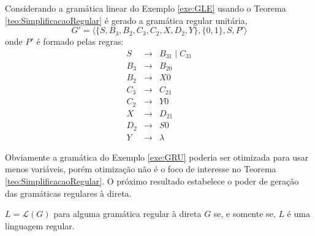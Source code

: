 \begin{exemplo}\label{exe:GRU}
	Considerando a gramática linear do Exemplo \ref{exe:GLE} usando o Teorema \ref{teo:SimplificacaoRegular} é gerado a gramática regular unitária, 
	$$G' = \langle \{S, B_3, B_2, C_3, C_2, X, D_2, Y\}, \{0, 1\}, S, P'\rangle$$ 
	onde $P'$ é formado pelas regras:
	\begin{eqnarray*}
		S & \rightarrow & B_31 \mid C_31\\
		B_3 & \rightarrow & B_20\\
		B_2 & \rightarrow & X0\\
		C_3 & \rightarrow & C_21\\
		C_2 & \rightarrow & Y0\\
		X & \rightarrow & D_21\\
		D_2 & \rightarrow& S0\\
		Y & \rightarrow & \lambda
	\end{eqnarray*}
\end{exemplo}

Obviamente a gramática do Exemplo \ref{exe:GRU} poderia ser otimizada para usar menos variáveis, porém otimização não é o foco de interesse no Teorema \ref{teo:SimplificacaoRegular}. O próximo resultado estabelece o poder de geração das gramáticas regulares à direta.

\begin{teorema}\label{teo:GRD-AFD}
	$L = \mathcal{L}(G)$ para alguma gramática regular à direta $G$ se, e somente se, $L$ é uma linguagem regular.
\end{teorema}

